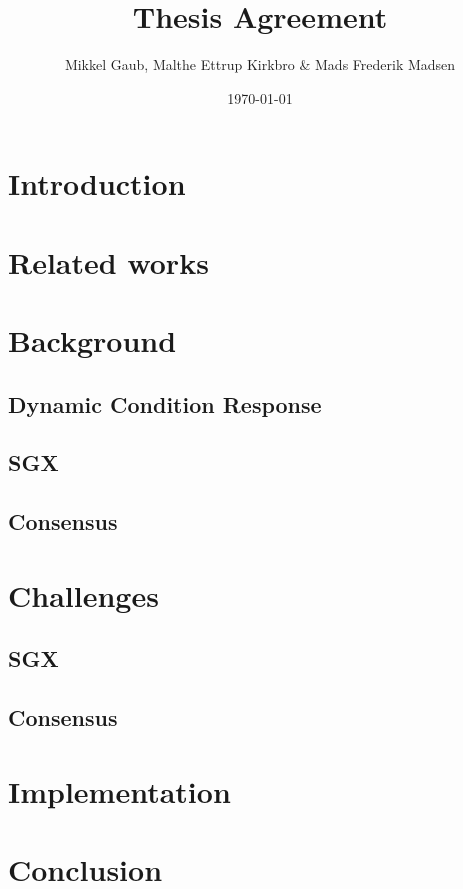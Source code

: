 \documentclass{article}
\author{Mikkel Gaub, Malthe Ettrup Kirkbro \& Mads Frederik Madsen}
\title{Thesis Agreement}
\date{\today}
\begin{document}
\maketitle

\pagebreak

	\section{Introduction}

	\section{Related works}

	\section{Background}

		\subsection{Dynamic Condition Response}

		\subsection{SGX}

		\subsection{Consensus}

	\section{Challenges}

		\subsection{SGX}

		\subsection{Consensus}	

	\section{Implementation}

	\section{Conclusion}

	\begin{thebibliography}{9}


	\end{thebibliography}
\end{document}
